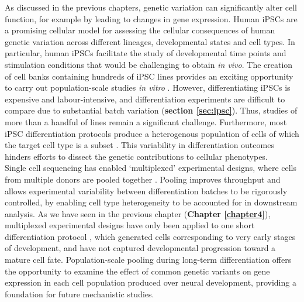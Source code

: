 As discussed in the previous chapters, genetic variation can significantly alter cell function, for example by leading to changes in gene expression. 
Human iPSCs are a promising cellular model for assessing the cellular consequences of human genetic variation across different lineages, developmental states and cell types. 
In particular, human iPSCs facilitate the study of developmental time points and stimulation conditions that would be challenging to obtain \textit{in vivo}. 
The creation of cell banks containing hundreds of iPSC lines \cite{kilpinen2017common} provides an exciting opportunity to carry out population-scale studies \textit{in vitro} \cite{cuomo2020single, strober2019dynamic, schwartzentruber2018molecular, alasoo2018shared}.
However, differentiating iPSCs is expensive and labour-intensive, and differentiation experiments are difficult to compare due to substantial batch variation (\textbf{section 
\ref{sec:ipsc}}).
Thus, studies of more than a handful of lines remain a significant challenge.
Furthermore, most iPSC differentiation protocols produce a heterogenous population of cells of which the target cell type is a subset \cite{d2019vitro, banovich2018impact, volpato2018reproducibility, nguyen2018single}. 
This variability in differentiation outcomes hinders efforts to dissect the genetic contributions to cellular phenotypes.\\

Single cell sequencing has enabled `multiplexed' experimental designs, where cells from multiple donors are pooled together \cite{cuomo2020single, nguyen2018single}. 
Pooling improves throughput and allows experimental variability between differentiation batches to be rigorously controlled, by enabling cell type heterogeneity to be accounted for in downstream analysis. 
As we have seen in the previous chapter (\textbf{Chapter 
\ref{chapter4}}),
multiplexed experimental designs have only been applied to one short differentiation protocol \cite{cuomo2020single}, which generated cells corresponding to very early stages of development, and have not captured developmental progression toward a mature cell fate. 
Population-scale pooling during long-term differentiation offers the opportunity to examine the effect of common genetic variants on gene expression in each cell population produced over neural development, providing a foundation for future mechanistic studies.\\

